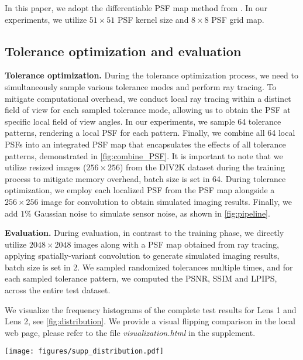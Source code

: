 In this paper, we adopt the differentiable PSF map method from \cite{yang2024curriculum}. In our experiments, we utilize $51 \times 51$ PSF kernel size and $8\times 8$ PSF grid map.

\subsection{Tolerance optimization and evaluation}
\textbf{Tolerance optimization.} During the tolerance optimization process, we need to simultaneously sample various tolerance modes and perform ray tracing. To mitigate computational overhead, we conduct local ray tracing within a distinct field of view for each sampled tolerance mode, allowing us to obtain the PSF at specific local field of view angles. In our experiments, we sample 64 tolerance patterns, rendering a local PSF for each pattern. Finally, we combine all 64 local PSFs into an integrated PSF map that encapsulates the effects of all tolerance patterns, demonstrated in \cref{fig:combine_PSF}. It is important to note that we utilize resized images ($256 \times 256$) from the DIV2K dataset \cite{agustsson2017ntire} during the training process to mitigate memory overhead, batch size is set in 64. During tolerance optimization, we employ each localized PSF from the PSF map alongside a $256 \times 256$ image for convolution to obtain simulated imaging results. Finally, we add $1\%$ Gaussian noise to simulate sensor noise, as shown in \cref{fig:pipeline}.

\vspace{0.8em}
\noindent\textbf{Evaluation.} During evaluation, in contrast to the training phase, we directly utilize $2048 \times 2048$ images along with a PSF map obtained from ray tracing, applying spatially-variant convolution to generate simulated imaging results, batch size is set in 2. We sampled randomized tolerances multiple times, and for each sampled tolerance pattern, we computed the PSNR, SSIM and LPIPS, across the entire test dataset. 

We visualize the frequency histograms of the complete test results for Lens 1 and Lens 2, see \cref{fig:distribution}.
We provide a visual flipping comparison in the local web page, please refer to the file \textit{visualization.html} in the supplement.

\begin{figure*}[tb] \centering
  \texttt{[image: figures/supp\_distribution.pdf]}
  \caption{Top: 100 times of random tolerances test for Lens1. Bottom: 200 times of random tolerances test for Lens2. The frequency distribution of the overall test indicates that the deep optics design, following tolerance-aware optimization, is significantly less impacted by tolerances.} 
  \label{fig:distribution}
\end{figure*}
